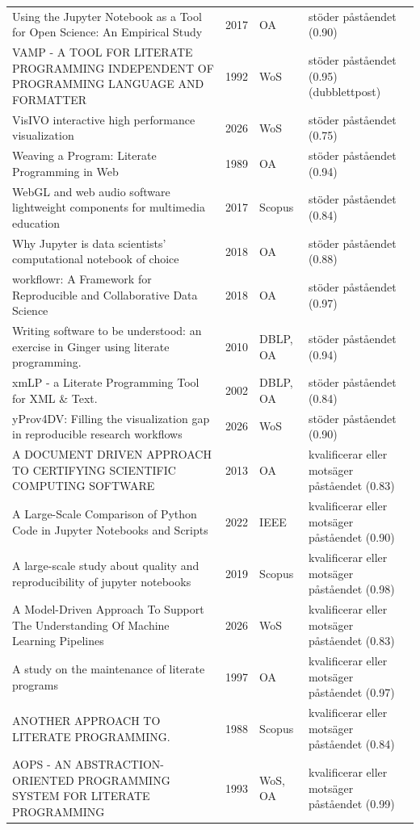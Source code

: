 \begin{longtable}{@{}%
  >{\raggedright\arraybackslash}p{}c%
  >{\raggedright\arraybackslash}p{}%
  >{\raggedright\arraybackslash}p{}@{}}
Using the Jupyter Notebook as a Tool for Open Science: An Empirical Study & 2017 & OA & stöder påståendet (0.90) \\
VAMP - A TOOL FOR LITERATE PROGRAMMING INDEPENDENT OF PROGRAMMING LANGUAGE AND FORMATTER & 1992 & WoS & stöder påståendet (0.95) (dubblettpost) \\
VisIVO interactive high performance visualization & 2026 & WoS & stöder påståendet (0.75) \\
Weaving a Program: Literate Programming in Web & 1989 & OA & stöder påståendet (0.94) \\
WebGL and web audio software lightweight components for multimedia education & 2017 & Scopus & stöder påståendet (0.84) \\
Why Jupyter is data scientists' computational notebook of choice & 2018 & OA & stöder påståendet (0.88) \\
workflowr: A Framework for Reproducible and Collaborative Data Science & 2018 & OA & stöder påståendet (0.97) \\
Writing software to be understood: an exercise in Ginger using literate programming. & 2010 & DBLP, OA & stöder påståendet (0.94) \\
xmLP - a Literate Programming Tool for XML \& Text. & 2002 & DBLP, OA & stöder påståendet (0.84) \\
yProv4DV: Filling the visualization gap in reproducible research workflows & 2026 & WoS & stöder påståendet (0.90) \\
A DOCUMENT DRIVEN APPROACH TO CERTIFYING SCIENTIFIC COMPUTING SOFTWARE & 2013 & OA & kvalificerar eller motsäger påståendet (0.83) \\
A Large-Scale Comparison of Python Code in Jupyter Notebooks and Scripts & 2022 & IEEE & kvalificerar eller motsäger påståendet (0.90) \\
A large-scale study about quality and reproducibility of jupyter notebooks & 2019 & Scopus & kvalificerar eller motsäger påståendet (0.98) \\
A Model-Driven Approach To Support The Understanding Of Machine Learning Pipelines & 2026 & WoS & kvalificerar eller motsäger påståendet (0.83) \\
A study on the maintenance of literate programs & 1997 & OA & kvalificerar eller motsäger påståendet (0.97) \\
ANOTHER APPROACH TO LITERATE PROGRAMMING. & 1988 & Scopus & kvalificerar eller motsäger påståendet (0.84) \\
AOPS - AN ABSTRACTION-ORIENTED PROGRAMMING SYSTEM FOR LITERATE PROGRAMMING & 1993 & WoS, OA & kvalificerar eller motsäger påståendet (0.99) \\

\end{longtable}
